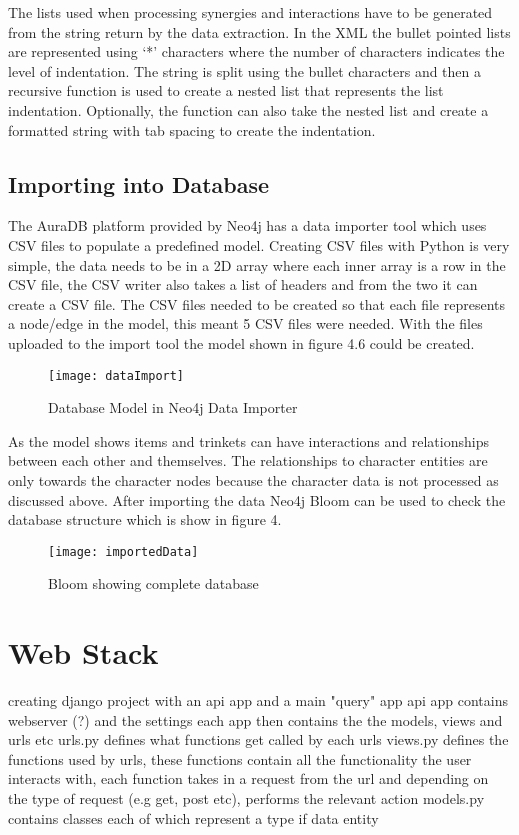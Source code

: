 The lists used when processing synergies and interactions have to be generated from the string return by the data extraction.
In the XML the bullet pointed lists are represented using `*' characters where the number of characters indicates the level of indentation.
The string is split using the bullet characters and then a recursive function is used to create a nested list that represents the list indentation.
Optionally, the function can also take the nested list and create a formatted string with tab spacing to create the indentation.
\subsection{Importing into Database}
The AuraDB platform provided by Neo4j has a data importer tool which uses CSV files to populate a predefined model. 
Creating CSV files with Python is very simple, the data needs to be in a 2D array where each inner array is a row in the CSV file,
the CSV writer also takes a list of headers and from the two it can create a CSV file. The CSV files needed to be created so that each file represents 
a node/edge in the model, this meant 5 CSV files were needed. With the files uploaded to the import tool the model shown in figure 4.6 could be created.
\begin{figure}[H]
    \centering
    \texttt{[image: dataImport]}
    \caption{Database Model in Neo4j Data Importer}
\end{figure}
As the model shows items and trinkets can have interactions and relationships between each other and themselves. The relationships to character 
entities are only towards the character nodes because the character data is not processed as discussed above.
After importing the data Neo4j Bloom can be used to check the database structure which is show in figure 4.
\begin{figure}[H]
    \centering
    \texttt{[image: importedData]}
    \caption{Bloom showing complete database}
\end{figure}
\section{Web Stack}


creating django project with an api app and a main "query" app
api app contains webserver (?) and the settings
each app then contains the the models, views and urls etc
urls.py defines what functions get called by each urls
views.py defines the functions used by urls, these functions contain all the functionality the user interacts with,
each function takes in a request from the url and depending on the type of request (e.g get, post etc), performs the relevant action
models.py contains classes each of which represent a type if data entity

